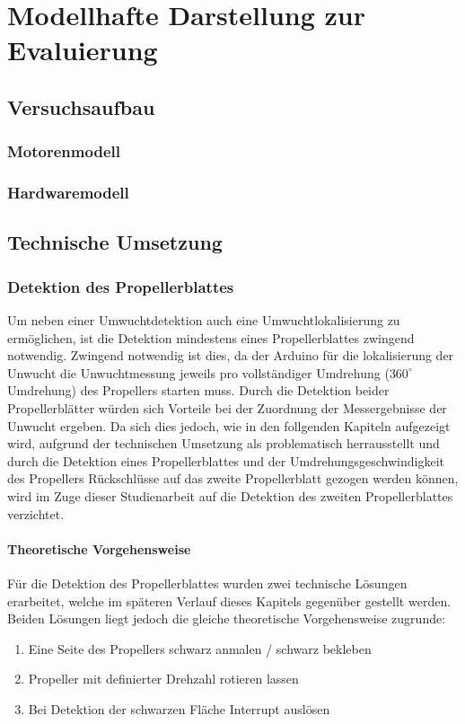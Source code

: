 
\chapter{Modellhafte Darstellung zur Evaluierung}

\section{Versuchsaufbau}

\subsection{Motorenmodell}

\subsection{Hardwaremodell}
\label{subsec:hardwaremodell}

\section{Technische Umsetzung}

\subsection{Detektion des Propellerblattes}
Um neben einer Umwuchtdetektion auch eine Umwuchtlokalisierung zu ermöglichen, ist die Detektion mindestens eines Propellerblattes zwingend notwendig.
Zwingend notwendig ist dies, da der Arduino für die lokalisierung der Unwucht die Unwuchtmessung jeweils pro vollständiger Umdrehung ($360^\circ$ Umdrehung) des Propellers starten muss.
Durch die Detektion beider Propellerblätter würden sich Vorteile bei der Zuordnung der Messergebnisse der Unwucht ergeben. 
Da sich dies jedoch, wie in den follgenden Kapiteln aufgezeigt wird, aufgrund der technischen Umsetzung als problematisch herrausstellt und durch die Detektion eines Propellerblattes und der Umdrehungsgeschwindigkeit des Propellers Rückschlüsse auf das zweite Propellerblatt gezogen werden können, wird im Zuge dieser Studienarbeit auf die Detektion des zweiten Propellerblattes verzichtet.

\subsubsection*{Theoretische Vorgehensweise}
Für die Detektion des Propellerblattes wurden zwei technische Lösungen erarbeitet, welche im späteren Verlauf dieses Kapitels gegenüber gestellt werden.
Beiden Lösungen liegt jedoch die gleiche theoretische Vorgehensweise zugrunde:
\begin{enumerate}
	\item Eine Seite des Propellers schwarz anmalen / schwarz bekleben
	\item Propeller mit definierter Drehzahl rotieren lassen
	\item Bei Detektion der schwarzen Fläche Interrupt auslösen
\end{enumerate}


